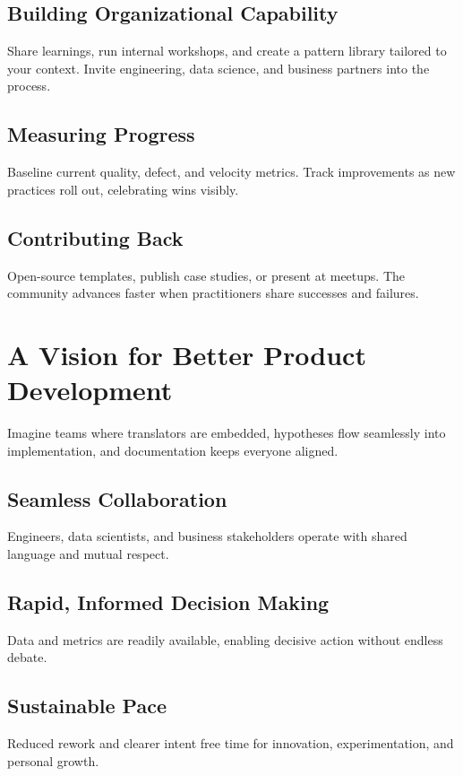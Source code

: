 \subsection{Building Organizational Capability}
Share learnings, run internal workshops, and create a pattern library tailored to your context. Invite engineering, data science, and business partners into the process.

\subsection{Measuring Progress}
Baseline current quality, defect, and velocity metrics. Track improvements as new practices roll out, celebrating wins visibly.

\subsection{Contributing Back}
Open-source templates, publish case studies, or present at meetups. The community advances faster when practitioners share successes and failures.

\section{A Vision for Better Product Development}
\label{sec:vision}

Imagine teams where translators are embedded, hypotheses flow seamlessly into implementation, and documentation keeps everyone aligned.

\subsection{Seamless Collaboration}
Engineers, data scientists, and business stakeholders operate with shared language and mutual respect.

\subsection{Rapid, Informed Decision Making}
Data and metrics are readily available, enabling decisive action without endless debate.

\subsection{Sustainable Pace}
Reduced rework and clearer intent free time for innovation, experimentation, and personal growth.

